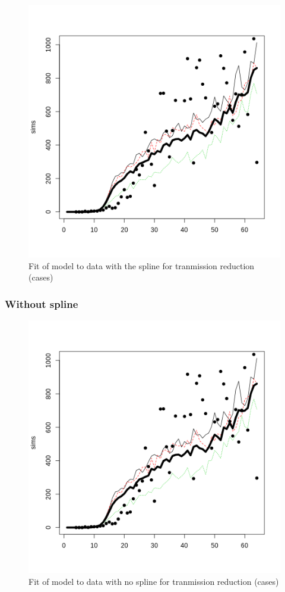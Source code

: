 \documentclass[]{article}
\begin{document}
\begin{figure}[!H]
\includegraphics[width=0.75\linewidth,]{nospline} \caption{Fit of model to data with the spline for tranmission reduction (cases)}\label{fig:fig1}
\end{figure}

\hypertarget{without-spline}{%
\subsubsection{Without spline}\label{without-spline}}

\begin{figure}[!H]
\includegraphics[width=1\linewidth,]{nospline} \caption{Fit of model to data with no spline for tranmission reduction (cases)}\label{fig:fig2}
\end{figure}
\end{document}
